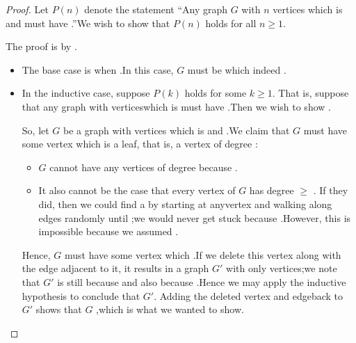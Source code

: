 \documentclass{tufte-handout}
\begin{document}
\begin{proof}
  Let $P(n)$ denote the statement ``Any graph $G$ with $n$ vertices
  which is \blank and \blank\linebreak
  must have \blank.''\linebreak  We wish to show
  that $P(n)$ holds for all $n \geq 1$.

  The proof is by \blank.
  \begin{itemize}
  \item The base case is when \blank.\linebreak In this case, $G$ must
    be \blank\linebreak which indeed \blank.
  \item In the inductive case, suppose $P(k)$ holds for some $k \geq
    1$.  That is, suppose that any graph with \blank vertices\linebreak which is
    \blank\linebreak must have \blank.\linebreak  Then we wish to show
    \blank.

    So, let $G$ be a graph with \blank vertices which is\linebreak
    \mbox{}\blank and \blank.\linebreak  We claim that $G$
    must have some vertex which is a leaf, that is, a vertex of degree \blank:
    \begin{itemize}
    \item $G$ cannot have any vertices of degree \blank\linebreak because
      \blank.
    \item It also cannot be the case that every vertex of $G$ has
      degree $\geq$ \blank.  If they did, then we could find a \blank
      by starting at any\linebreak vertex and walking along edges
      randomly until \blank;\linebreak we would never get stuck
      because \blank.\linebreak However, this is impossible because we
      assumed \blank.
    \end{itemize}
    Hence, $G$ must have some vertex which \blank.\linebreak If we
    delete this vertex along with the edge adjacent to it, it results
    in a graph $G'$ with only \blank vertices;\linebreak we note that
    $G'$ is still \blank\linebreak because \blank\linebreak and also
    \blank\linebreak because \blank.\linebreak  Hence we may apply the
    inductive hypothesis to conclude that $G'$\linebreak \mbox{}\blank.
    Adding the deleted vertex and edge\linebreak back to $G'$ shows that $G$
    \blank,\linebreak which is what we wanted to show.
  \end{itemize}
\end{proof}
\end{document}
